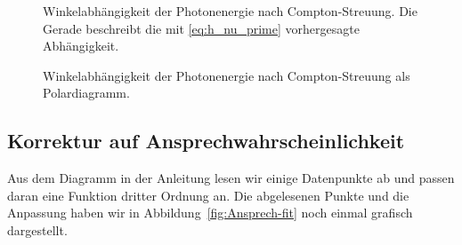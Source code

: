 \documentclass[11pt, ngerman, fleqn, DIV=15, headinclude, BCOR=2cm]{scrreprt}
\begin{document}
\begin{figure}[htbp]
    \centering
    \caption{%
        Winkelabhängigkeit der Photonenergie nach Compton-Streuung. Die Gerade
        beschreibt die mit \eqref{eq:h_nu_prime} vorhergesagte Abhängigkeit.
    }
    \label{fig:E_winkelabhaengigkeit}
\end{figure}

\begin{figure}[htbp]
    \centering
    \caption{%
        Winkelabhängigkeit der Photonenergie nach Compton-Streuung als
        Polardiagramm.
    }
    \label{fig:nishina-ex}
\end{figure}

\subsection{Korrektur auf Ansprechwahrscheinlichkeit}


Aus dem Diagramm in der Anleitung
\parencite[Abbildung~P526.3]{physik512-Anleitung} lesen wir einige Datenpunkte
ab und passen daran eine Funktion dritter Ordnung an. Die abgelesenen Punkte
und die Anpassung haben wir in Abbildung~\ref{fig:Ansprech-fit} noch einmal
grafisch dargestellt.
\end{document}
